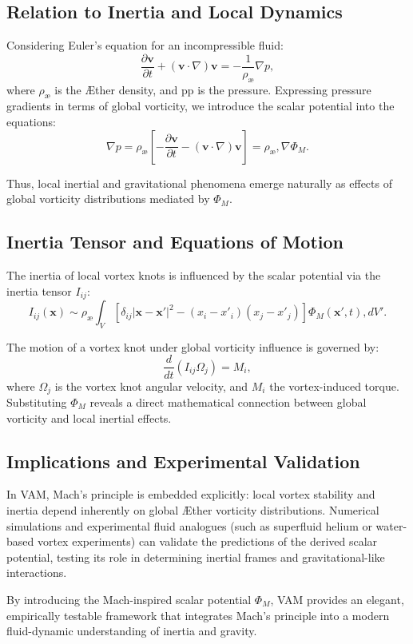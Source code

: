 \subsection{Relation to Inertia and Local Dynamics}
Considering Euler's equation for an incompressible fluid:
\begin{equation}
    \frac{\partial \mathbf{v}}{\partial t}+(\mathbf{v}\cdot \nabla)\mathbf{v}=-\frac{1}{\rho_{\text{\ae}}}\nabla p,
\end{equation}
where $\rho_{\text{\ae}}$ is the Æther density, and pp is the pressure. Expressing pressure gradients in terms of global vorticity, we introduce the scalar potential into the equations:
\begin{equation}
    \nabla p = \rho_{\text{\ae}}\left[-\frac{\partial\mathbf{v}}{\partial t} - (\mathbf{v}\cdot\nabla)\mathbf{v}\right] = \rho_{\text{\ae}}, \nabla \Phi_M.
\end{equation}


Thus, local inertial and gravitational phenomena emerge naturally as effects of global vorticity distributions mediated by $\Phi_M$.


\subsection{Inertia Tensor and Equations of Motion}
The inertia of local vortex knots is influenced by the scalar potential via the inertia tensor $I_{ij}$:
\begin{equation}
    I_{ij}(\mathbf{x}) \sim \rho_{\text{\ae}}\int_V \left[\delta_{ij}|\mathbf{x}-\mathbf{x}'|^2 - (x_i - x'_i)(x_j - x'_j)\right]\Phi_M(\mathbf{x}',t), dV'.
\end{equation}


The motion of a vortex knot under global vorticity influence is governed by:
\begin{equation}
    \frac{d}{dt}(I_{ij}\Omega_j) = M_i,
\end{equation}
where $\Omega_j$ is the vortex knot angular velocity, and $M_i$ the vortex-induced torque. Substituting $\Phi_M$ reveals a direct mathematical connection between global vorticity and local inertial effects.


\subsection{Implications and Experimental Validation}
In VAM, Mach's principle is embedded explicitly: local vortex stability and inertia depend inherently on global Æther vorticity distributions. Numerical simulations and experimental fluid analogues (such as superfluid helium or water-based vortex experiments) can validate the predictions of the derived scalar potential, testing its role in determining inertial frames and gravitational-like interactions.


By introducing the Mach-inspired scalar potential $\Phi_M$, VAM provides an elegant, empirically testable framework that integrates Mach's principle into a modern fluid-dynamic understanding of inertia and gravity.